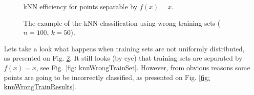 \begin{figure}
\hfill
{}
\hfill
\caption{kNN efficiency for points separable by $f(x) = x$.}
\label{fig: knnSepRes}
\end{figure}

\begin{figure}
\hfill
{}
\hfill
{}
\hfill
\hfill
\caption{The example of the kNN classification using wrong training sets ($n = 100$, $k = 50$).}
\label{fig: knnWrongTrain}
\end{figure}

Lets take a look what happens when training sets are not uniformly distributed, as presented on Fig. \ref{fig: knnWrongTrain}. It still looks (by eye) that training sets are separated by $f(x) = x$, see Fig. \ref{fig: knnWrongTrainSet}. However, from obvious reasons some points are going to be incorrectly classified, as presented on Fig. \ref{fig: knnWrongTrainResults}.

